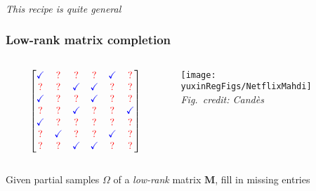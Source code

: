 \documentclass[compress,
mathserif,wide,%
]{beamer}
\newcommand{\yuxinRegFigs}{figure}
\begin{document}
\begin{frame}[plain]
	\frametitle{}

\vfill 

\centering 
	{\em\Large This recipe is quite general}

\vfill

\end{frame}




\begin{frame}
\frametitle{Low-rank matrix completion}



\begin{columns}
\begin{column}{0.5\textwidth}
\[
 \begin{bmatrix}
   {\color{blue} \checkmark} & {\color{red} ?} &{\color{red} ?}  & {\color{red} ?} & {\color{blue} \checkmark} & {\color{red} ?} \\
   {\color{red} ?} & {\color{red} ?} & {\color{blue} \checkmark} & {\color{blue} \checkmark} & {\color{red} ?} & {\color{red} ?} \\
   {\color{blue} \checkmark} & {\color{red} ?} & {\color{red} ?} & {\color{blue} \checkmark} & {\color{red} ?} & {\color{red} ?} \\
   {\color{red} ?} & {\color{red} ?} & {\color{blue} \checkmark}  & {\color{red} ?} &{\color{red} ?}  & {\color{blue} \checkmark} \\
   {\color{blue} \checkmark}  &  {\color{red} ?} & {\color{red} ?} & {\color{red} ?}  & {\color{red} ?} & {\color{red} ?} \\
   {\color{red} ?} & {\color{blue} \checkmark} &{\color{red} ?}  & {\color{red} ?} & {\color{blue} \checkmark} & {\color{red} ?} \\
   {\color{red} ?}  &{\color{red} ?} & {\color{blue} \checkmark} &
   {\color{blue} \checkmark} & {\color{red} ?} & {\color{red} ?}
\end{bmatrix}
\]
\end{column}

\begin{column}{0.5\textwidth}  
\begin{center}
\texttt{[image: \\yuxinRegFigs/NetflixMahdi]} \\
\hfill {\footnotesize\em Fig.~credit: Cand\`es ~~}
\end{center}
\end{column}

\end{columns}

\bigskip

Given partial samples $\Omega$ of a {\em low-rank} matrix $\bm{M}$, fill in missing entries 


\end{frame}
\end{document}
